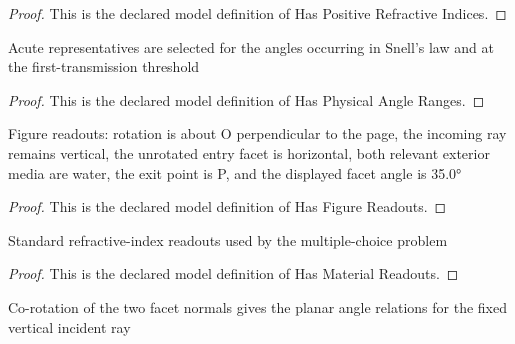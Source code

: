 \begin{proof}
  This is the declared model definition of Has Positive Refractive Indices.
\end{proof}
\begin{definition}
  \label{def:physics:phyx-mini-0011:phyxminiproblems-problemphyxmini0011-hasphysicalangleranges}
  Acute representatives are selected for the angles occurring in Snell's law and at the first-transmission threshold
\end{definition}
\begin{proof}
  This is the declared model definition of Has Physical Angle Ranges.
\end{proof}
\begin{definition}
  \label{def:physics:phyx-mini-0011:phyxminiproblems-problemphyxmini0011-hasfigurereadouts}
  Figure readouts: rotation is about O perpendicular to the page, the incoming ray remains vertical, the unrotated entry facet is horizontal, both relevant exterior media are water, the exit point is P, and the displayed facet angle is 35.0°
\end{definition}
\begin{proof}
  This is the declared model definition of Has Figure Readouts.
\end{proof}
\begin{definition}
  \label{def:physics:phyx-mini-0011:phyxminiproblems-problemphyxmini0011-hasmaterialreadouts}
  Standard refractive-index readouts used by the multiple-choice problem
\end{definition}
\begin{proof}
  This is the declared model definition of Has Material Readouts.
\end{proof}
\begin{definition}
  \label{def:physics:phyx-mini-0011:phyxminiproblems-problemphyxmini0011-hasrotatedraygeometry}
  Co-rotation of the two facet normals gives the planar angle relations for the fixed vertical incident ray
\end{definition}

